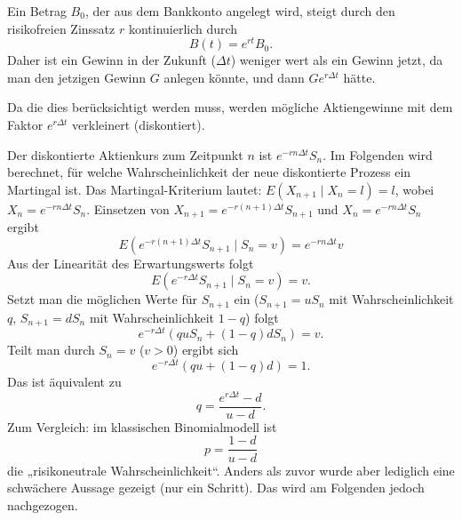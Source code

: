 \begin{bem}\label{bem:q_prob_1_step}
Ein Betrag $B_0$, der aus dem Bankkonto angelegt wird, steigt durch den risikofreien Zinssatz $r$ kontinuierlich durch
$$B(t) = e^{rt}B_0.$$
Daher ist ein Gewinn in der Zukunft ($\Delta t$) weniger wert als ein Gewinn jetzt, da man den jetzigen Gewinn $G$ anlegen könnte, und 
dann $Ge^{r \Delta t}$ hätte. 

Da die dies berücksichtigt werden muss,
werden mögliche Aktiengewinne mit dem Faktor $e^{r \Delta t}$ verkleinert (diskontiert).

Der diskontierte Aktienkurs zum Zeitpunkt $n$ ist $e^{-r n \Delta t} S_n$.
Im Folgenden wird berechnet, für welche Wahrscheinlichkeit der neue diskontierte Prozess
ein Martingal ist. Das Martingal-Kriterium lautet: $E(X_{n+1} \mid X_n = l) = l$, wobei $X_n = e^{-r n \Delta t} S_n$.
Einsetzen von $X_{n+1} = e^{-r (n+1) \Delta t} S_{n+1}$ und $X_n = e^{-r n \Delta t} S_n$ ergibt
$$
E(e^{-r (n+1) \Delta t} S_{n+1} \mid S_n = v) = e^{-r n \Delta t} v
$$
Aus der Linearität des Erwartungswerts folgt
$$
E(e^{-r \Delta t} S_{n+1} \mid S_n=v) = v.
$$
Setzt man die möglichen Werte für $S_{n+1}$ ein ($S_{n+1} = u S_n$ mit Wahrscheinlichkeit $q$, $S_{n+1} = d S_n$ mit Wahrscheinlichkeit $1-q$) folgt
$$
e^{-r \Delta t} \left( q u S_n + (1-q) d S_n \right) = v.
$$
Teilt man durch $S_n = v$ ($v > 0$) ergibt sich
$$
e^{-r \Delta t} \left( q u + (1-q) d \right) = 1.
$$
Das ist äquivalent zu
$$
q = \frac{e^{r \Delta t} - d}{u - d}.
$$
Zum Vergleich: im klassischen Binomialmodell ist 
$$p = \frac{1 - d}{u - d}$$
die „risikoneutrale Wahrscheinlichkeit“. Anders als zuvor
wurde aber lediglich eine schwächere Aussage gezeigt (nur ein Schritt). 
Das wird am Folgenden jedoch nachgezogen.

\end{bem}

